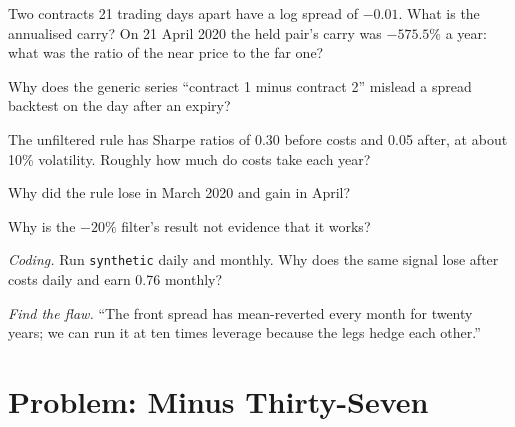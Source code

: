 \begin{exercise}[$\star$]\label{exo:s1:calendar-spreads-and-curve-trades:2}
Two contracts 21 trading days apart have a log spread of $-0.01$. What is the annualised carry? On 21 April 2020 the held pair's carry was $-575.5\%$ a
year: what was the ratio of the near price to the far one?
\end{exercise}

\begin{exercise}[$\star$]\label{exo:s1:calendar-spreads-and-curve-trades:3}
Why does the generic series ``contract 1 minus contract 2'' mislead a spread backtest on the day after an expiry?
\end{exercise}

\begin{exercise}[$\star\star$]\label{exo:s1:calendar-spreads-and-curve-trades:4}
The unfiltered rule has Sharpe ratios of 0.30 before costs and 0.05 after, at about 10\% volatility. Roughly how much do costs take each year?
\end{exercise}

\begin{exercise}[$\star\star$]\label{exo:s1:calendar-spreads-and-curve-trades:5}
Why did the rule lose in March 2020 and gain in April?
\end{exercise}

\begin{exercise}[$\star\star$]\label{exo:s1:calendar-spreads-and-curve-trades:6}
Why is the $-20\%$ filter's result not evidence that it works?
\end{exercise}

\begin{exercise}[$\star\star\star$]\label{exo:s1:calendar-spreads-and-curve-trades:7}
\emph{Coding.} Run \texttt{synthetic} daily and monthly. Why does the same signal lose after costs daily and earn 0.76 monthly?
\end{exercise}

\begin{exercise}[$\star\star\star$]\label{exo:s1:calendar-spreads-and-curve-trades:8}
\emph{Find the flaw.} ``The front spread has mean-reverted every month for twenty years; we can run it at ten times leverage because the legs hedge
each other.''
\end{exercise}

\section{Problem: Minus Thirty-Seven}

